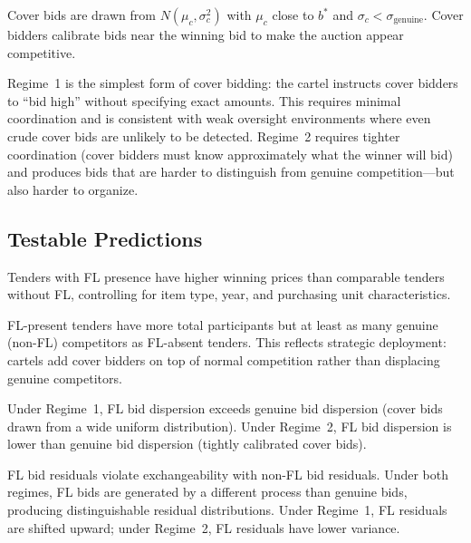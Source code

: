 \begin{definition}
\label{def:regime2}
Cover bids are drawn from $N(\mu_c, \sigma_c^2)$ with $\mu_c$ close to
$b^*$ and $\sigma_c < \sigma_{\text{genuine}}$. Cover bidders calibrate
bids near the winning bid to make the auction appear competitive.
\end{definition}

Regime~1 is the simplest form of cover bidding: the cartel instructs
cover bidders to ``bid high'' without specifying exact amounts. This
requires minimal coordination and is consistent with weak oversight
environments where even crude cover bids are unlikely to be detected.
Regime~2 requires tighter coordination (cover bidders must know
approximately what the winner will bid) and produces bids that are
harder to distinguish from genuine competition---but also harder to
organize.

\subsection{Testable Predictions}

\begin{prediction}
\label{pred:price}
Tenders with FL presence have higher winning prices than comparable
tenders without FL, controlling for item type, year, and purchasing
unit characteristics.
\end{prediction}

\begin{prediction}
\label{pred:selection}
FL-present tenders have more total participants but at least as many
genuine (non-FL) competitors as FL-absent tenders. This reflects
strategic deployment: cartels add cover bidders on top of normal
competition rather than displacing genuine competitors.
\end{prediction}

\begin{prediction}
\label{pred:regime}
Under Regime~1, FL bid dispersion exceeds genuine bid dispersion (cover
bids drawn from a wide uniform distribution). Under Regime~2, FL bid
dispersion is lower than genuine bid dispersion (tightly calibrated
cover bids).
\end{prediction}

\begin{prediction}
\label{pred:exchange}
FL bid residuals violate exchangeability with non-FL bid residuals. Under
both regimes, FL bids are generated by a different process than genuine
bids, producing distinguishable residual distributions. Under Regime~1,
FL residuals are shifted upward; under Regime~2, FL residuals have
lower variance.
\end{prediction}

